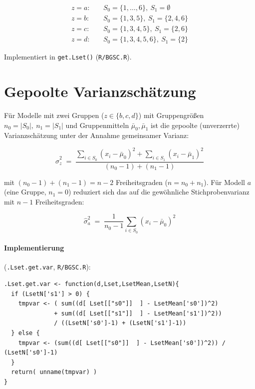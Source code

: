 \documentclass[11pt,a4paper]{article}
\begin{document}
\begin{align*}
z=a:\quad & S_0 = \{1,\dots,6\},\ S_1=\emptyset \\
z=b:\quad & S_0 = \{1,3,5\},\ S_1=\{2,4,6\} \\
z=c:\quad & S_0 = \{1,3,4,5\},\ S_1=\{2,6\} \\
z=d:\quad & S_0 = \{1,3,4,5,6\},\ S_1=\{2\}
\end{align*}

Implementiert in \texttt{get.Lset()} (\texttt{R/BGSC.R}).

\section{Gepoolte Varianzschätzung}
\label{sec:variance}

Für Modelle mit zwei Gruppen ($z \in \{b,c,d\}$) mit Gruppengrößen
$n_0=|S_0|,\ n_1=|S_1|$ und Gruppenmitteln $\bar\mu_0,\bar\mu_1$ ist die
gepoolte (unverzerrte) Varianzschätzung unter der Annahme gemeinsamer Varianz:

\begin{equation}
\hat\sigma^2_z \;=\; \frac{\displaystyle\sum_{i \in S_0}(x_i-\bar\mu_0)^2
                     + \sum_{i \in S_1}(x_i-\bar\mu_1)^2}
                    {(n_0-1)+(n_1-1)}
\label{eq:pooled-var}
\end{equation}

mit $(n_0-1)+(n_1-1) = n-2$ Freiheitsgraden ($n=n_0+n_1$). Für Modell $a$
(eine Gruppe, $n_1=0$) reduziert sich das auf die gewöhnliche
Stichprobenvarianz mit $n-1$ Freiheitsgraden:

\begin{equation}
\hat\sigma^2_a \;=\; \frac{1}{n_0-1}\sum_{i \in S_0}(x_i - \bar\mu_0)^2
\label{eq:single-var}
\end{equation}

\paragraph{Implementierung} (\texttt{.Lset.get.var}, \texttt{R/BGSC.R}):

\begin{lstlisting}
.Lset.get.var <- function(d,Lset,LsetMean,LsetN){
  if (LsetN['s1'] > 0) {
    tmpvar <- ( sum((d[ Lset[["s0"]]  ] - LsetMean['s0'])^2)
              + sum((d[ Lset[["s1"]]  ] - LsetMean['s1'])^2))
              / ((LsetN['s0']-1) + (LsetN['s1']-1))
  } else {
    tmpvar <- (sum((d[ Lset[["s0"]]  ] - LsetMean['s0'])^2)) / (LsetN['s0']-1)
  }
  return( unname(tmpvar) )
}
\end{lstlisting}
\end{document}
